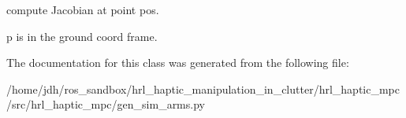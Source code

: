compute \-Jacobian at point pos. 

p is in the ground coord frame. 

\-The documentation for this class was generated from the following file\-:\begin{DoxyCompactItemize}
\item 
/home/jdh/ros\-\_\-sandbox/hrl\-\_\-haptic\-\_\-manipulation\-\_\-in\-\_\-clutter/hrl\-\_\-haptic\-\_\-mpc/src/hrl\-\_\-haptic\-\_\-mpc/gen\-\_\-sim\-\_\-arms.\-py\end{DoxyCompactItemize}
